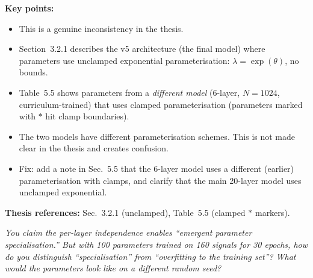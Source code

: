 \documentclass[11pt, letterpaper]{article}
\newcounter{qcounter}
\newcommand{\question}[1]{%
  \stepcounter{qcounter}%
  \begin{questionbox}[Q\theqcounter]%
    \itshape #1%
  \end{questionbox}%
}
\begin{document}
\begin{answerbox}
\textbf{Key points:}
\begin{itemize}[nosep]
  \item This is a genuine inconsistency in the thesis.
  \item Section~3.2.1 describes the v5 architecture (the final model)
        where parameters use unclamped exponential parameterisation:
        $\lambda = \exp(\theta)$, no bounds.
  \item Table~5.5 shows parameters from a \emph{different model}
        (6-layer, $N{=}1024$, curriculum-trained) that uses clamped
        parameterisation (parameters marked with $*$ hit clamp
        boundaries).
  \item The two models have different parameterisation schemes.  This
        is not made clear in the thesis and creates confusion.
  \item Fix: add a note in Sec.~5.5 that the 6-layer model uses a
        different (earlier) parameterisation with clamps, and clarify
        that the main 20-layer model uses unclamped exponential.
\end{itemize}
\textbf{Thesis references:} Sec.~3.2.1 (unclamped), Table~5.5 (clamped $*$ markers).
\end{answerbox}

\question{You claim the per-layer independence enables ``emergent parameter
specialisation.''  But with 100 parameters trained on 160 signals
for 30 epochs, how do you distinguish ``specialisation'' from
``overfitting to the training set''?  What would the parameters
look like on a different random seed?}
\end{document}
